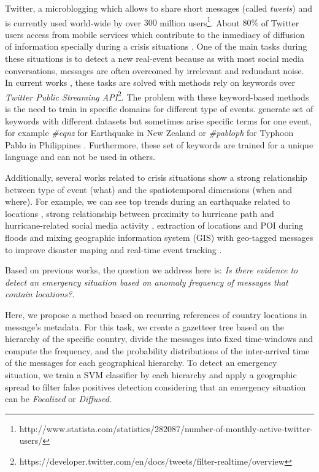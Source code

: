 \documentclass[sigconf]{acmart}
\begin{document}
Twitter, a microblogging which allows to share short messages (called \textit{tweets}) and is currently used world-wide by over $300$ million users\footnote{http://www.statista.com/statistics/282087/number-of-monthly-active-twitter-users/}. About $80\%$ of Twitter users access from mobile services which contribute to the inmediacy of diffusion of information specially during a crisis situations \cite{castillo2016big}. One of the main tasks during these situations is to detect a new real-event because as with most social media conversations, messages are often overcomed by irrelevant and redundant noise. In current works \cite{kumar2011tweettracker,caragea2011classifying,imranaidr2014,maldonado2017}, these tasks are solved with methods rely on keywords over \textit{Twitter Public Streaming API}\footnote{https://developer.twitter.com/en/docs/tweets/filter-realtime/overview}. The problem with these keyword-based methods is the need to train in specific domains for different type of events. \cite{olteanu2014} generate set of keywords with different datasets but sometimes arise specific terms for one event, for example \textit{\#eqnz} for Earthquake in New Zealand or \textit{\#pabloph} for Typhoon Pablo in Philippines \cite{potts2011tweeting,bruns2012local,karimi2013classifying}. Furthermore, these set of keywords are trained for a unique language and can not be used in others.

Additionally, several works related to crisis situations show a strong relationship between type of event (what) and the spatiotemporal dimensions (when and where). For example, we can see top trends during an earthquake related to locations \cite{mendoza2010twitter}, strong relationship between proximity to hurricane path and hurricane-related social media activity \cite{kryvasheyeu2016rapid}, extraction of locations and POI during floods \cite{lingad2013location} and mixing geographic information system (GIS) with geo-tagged messages to improve disaster maping and real-time event tracking \cite{huang2015disastermapper}.

Based on previous works, the question we address here is: \textit{Is there evidence to detect an emergency situation based on anomaly frequency of messages that contain locations?}.

Here, we propose a method based on recurring references of country locations in message's metadata. For this task, we create a gazetteer tree based on the hierarchy of the specific country, divide the messages into fixed time-windows and compute the frequency, and the probability distributions of the inter-arrival time of the messages for each geographical hierarchy. To detect an emergency situation, we train a SVM classifier by each hierarchy and apply a geographic spread to filter false positives detection considering that an emergency situation can be \textit{Focalized} or \textit{Diffused}.  
\end{document}

